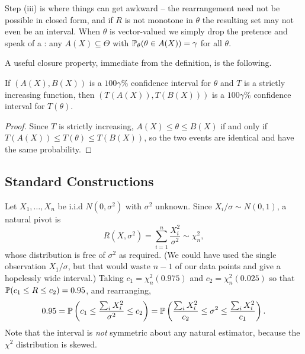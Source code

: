 \documentclass[a4paper]{scrartcl}
\begin{document}
Step (iii) is where things can get awkward -- the rearrangement need not be possible in closed form, and if $R$ is not monotone in $\theta$ the resulting set may not even be an interval. When $\theta$ is vector-valued we simply drop the pretence and speak of a : any $A(X) \subseteq \Theta$ with $\mathbb{P}_\theta(\theta \in A(X)) = \gamma$ for all $\theta$.

A useful closure property, immediate from the definition, is the following.

\begin{proposition}
  If $(A(X), B(X))$ is a $100\gamma\%$ confidence interval for $\theta$ and $T$ is a strictly increasing function, then $\left(T(A(X)), T(B(X))\right)$ is a $100\gamma\%$ confidence interval for $T(\theta)$.
\end{proposition}
\begin{proof}
  Since $T$ is strictly increasing, $A(X) \leq \theta \leq B(X)$ if and only if $T(A(X)) \leq T(\theta) \leq T(B(X))$, so the two events are identical and have the same probability.
\end{proof}

\subsection{Standard Constructions}

\begin{example}
  Let $X_1, \dots, X_n$ be i.i.d $N(0, \sigma^2)$ with $\sigma^2$ unknown. Since $X_i/\sigma \sim N(0,1)$, a natural pivot is
  $$
  R(X, \sigma^2) = \sum_{i=1}^{n}\frac{X_i^2}{\sigma^2} \sim \chi^2_n,
  $$
  whose distribution is free of $\sigma^2$ as required. (We could have used the single observation $X_1/\sigma$, but that would waste $n - 1$ of our data points and give a hopelessly wide interval.) Taking $c_1 = \chi^2_n(0.975)$ and $c_2 = \chi^2_n(0.025)$ so that $\mathbb{P}(c_1 \leq R \leq c_2) = 0.95$, and rearranging,
  $$
  0.95 = \mathbb{P}\left(c_1 \leq \frac{\sum_i X_i^2}{\sigma^2} \leq c_2\right) = \mathbb{P}\left(\frac{\sum_i X_i^2}{c_2} \leq \sigma^2 \leq \frac{\sum_i X_i^2}{c_1}\right).
  $$
  Note that the interval is \emph{not} symmetric about any natural estimator, because the $\chi^2$ distribution is skewed.
\end{example}
\end{document}
